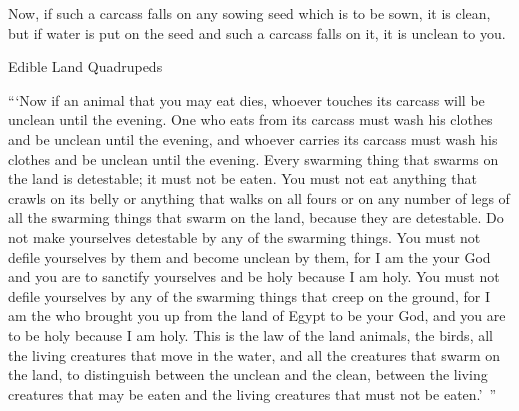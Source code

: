 {Now, if
such a carcass
falls
on
any
sowing
seed which
is to be sown,
it is
clean,
but if
water
is put
on
the seed
and such a carcass
falls
on
it, it is
unclean to you.
\par }{\SH Edible Land Quadrupeds
\par }{\PP {}“‘Now if
an animal
that
you may eat dies,
whoever touches
its
carcass
will be unclean
until
the evening.
One who eats
from its carcass
must wash
his clothes
and be unclean
until
the evening,
and whoever carries
its carcass
must wash
his clothes
and be unclean
until
the evening.
Every
swarming thing
that swarms
on
the land
is detestable;
it must not
be eaten.
You must not
eat
anything
that crawls
on
its belly
or anything
that walks
on
all fours
or on any
number
of legs
of all
the swarming things
that swarm
on
the land,
because
they
are detestable.
Do not
make yourselves
detestable
by any
of the swarming things.
You must not
defile
yourselves by them and become unclean by them,
for
I am
the {}
your God
and you are to sanctify
yourselves and be
holy
because
I am
holy.
You must not
defile
yourselves
by any
of the swarming things
that creep
on
the ground,
for
I am
the {}
who brought you up
from the land
of Egypt
to be
your God,
and you are to be
holy
because
I am
holy.
This
is the law
of the land animals,
the birds,
all
the living
creatures
that move
in the water,
and all
the creatures
that swarm
on
the land,
to distinguish
between
the unclean
and the clean,
between
the living
creatures that may be eaten
and the living
creatures that
must not
be eaten.’ ”

\par }

